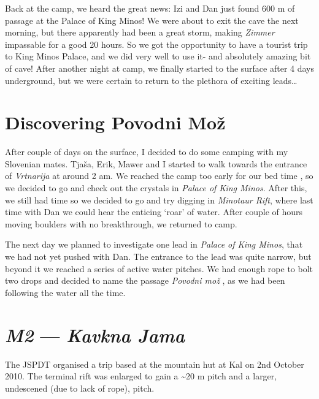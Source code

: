 Back at the camp, we heard the great news: Izi and Dan just found 600 m
of passage at the Palace of King Minos! We were about to exit the cave
the next morning, but there apparently had been a great storm, making
\emph{Zimmer} impassable for a good 20 hours. So we got the opportunity
to have a tourist trip to King Minos Palace, and we did very well to use
it- and absolutely amazing bit of cave! After another night at camp, we
finally started to the surface after 4 days underground, but we were
certain to return to the plethora of exciting leads\ldots{}


\hypertarget{discovering-povodni-moux17e}{%
\section{Discovering Povodni Mož}\label{discovering-povodni-moux17e}}

After couple of days on the surface, I decided to do some camping with
my Slovenian mates. Tjaša, Erik, Mawer and I started to walk towards the
entrance of \emph{Vrtnarija} at around 2 am. We reached the camp too
early for our bed time
, so we
decided to go and check out the crystals in \emph{Palace of King Minos}.
After this, we still had time so we decided to go and try digging in
\emph{Minotaur Rift}, where last time with Dan we could hear the
enticing `roar' of water. After couple of hours moving boulders with no
breakthrough, we returned to camp.

The next day we planned to investigate one lead in \emph{Palace of King
Minos}, that we had not yet pushed with Dan. The entrance to the lead
was quite narrow, but beyond it we reached a series of active water
pitches. We had enough rope to bolt two drops and decided to name the
passage \emph{Povodni mož} , as we had been
following the water all the time.

\attrib{\izi}

\hypertarget{m2-kavkna-jama}{%
\section{\texorpdfstring{\emph{M2} --- \emph{Kavkna
Jama}}{M2 --- Kavkna Jama}}\label{m2-kavkna-jama}}

The JSPDT organised a trip based at the mountain hut at Kal on 2nd
October 2010. The terminal rift was enlarged to gain a
\textasciitilde 20 m pitch and a larger, undescened (due to lack of
rope), pitch.

